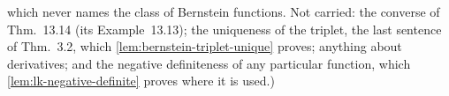 \begin{theorem}
{which never names the class of Bernstein functions. Not carried: the converse of Thm.~13.14 (its
Example~13.13); the uniqueness of the triplet, the last sentence of Thm.~3.2, which
\ref{lem:bernstein-triplet-unique} proves; anything about derivatives; and the negative
definiteness of any particular function, which \ref{lem:lk-negative-definite} proves where it is
used.)}
\end{theorem}

